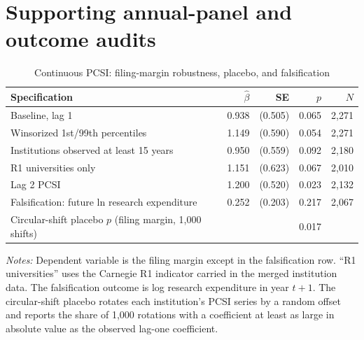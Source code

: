 \section{Supporting annual-panel and outcome audits}\label{app:annual}

\begin{table}[htbp]\centering
\caption{Continuous PCSI: filing-margin robustness, placebo, and falsification}\label{tab:twferobust}
\begin{threeparttable}\footnotesize
\begin{tabular}{lrrrr}\toprule
Specification & $\hat\beta$ & SE & $p$ & $N$ \\\midrule
Baseline, lag 1 & 0.938 & (0.505) & 0.065 & 2,271 \\
Winsorized 1st/99th percentiles & 1.149 & (0.590) & 0.054 & 2,271 \\
Institutions observed at least 15 years & 0.950 & (0.559) & 0.092 & 2,180 \\
R1 universities only & 1.151 & (0.623) & 0.067 & 2,010 \\
Lag 2 PCSI & 1.200 & (0.520) & 0.023 & 2,132 \\
Falsification: future ln research expenditure & 0.252 & (0.203) & 0.217 & 2,067 \\
Circular-shift placebo $p$ (filing margin, 1,000 shifts) &  &  & 0.017 &  \\
\bottomrule
\end{tabular}
\begin{tablenotes}[flushleft]\footnotesize
\item \textit{Notes:} Dependent variable is the filing margin except in the falsification row. ``R1 universities'' uses the Carnegie R1 indicator carried in the merged institution data. The falsification outcome is log research expenditure in year $t+1$. The circular-shift placebo rotates each institution's PCSI series by a random offset and reports the share of 1,000 rotations with a coefficient at least as large in absolute value as the observed lag-one coefficient.
\end{tablenotes}
\end{threeparttable}
\end{table}

